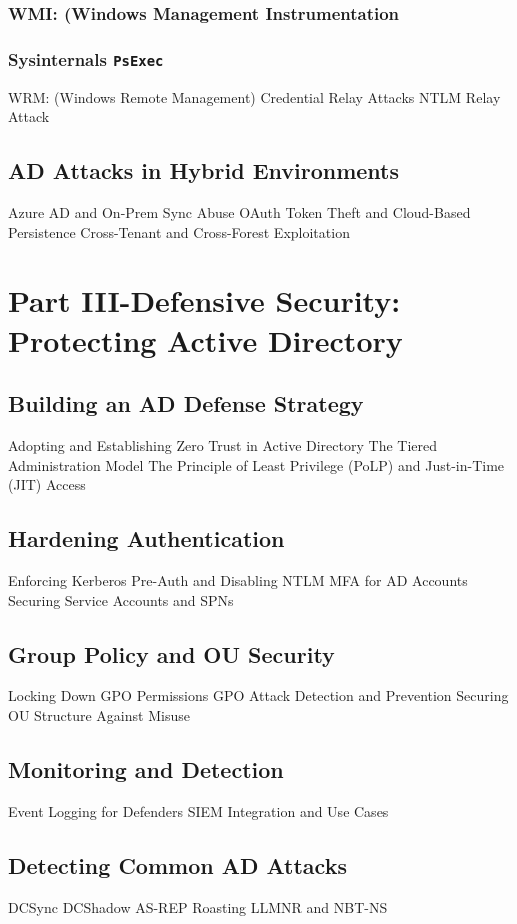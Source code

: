 \documentclass{article}
\begin{document}
\subsubsection{WMI: (Windows Management Instrumentation}
\subsubsection{Sysinternals \texttt{PsExec}}
WRM: (Windows Remote Management)
Credential Relay Attacks
NTLM Relay Attack

\subsection{AD Attacks in Hybrid Environments}
Azure AD and On-Prem Sync Abuse
OAuth Token Theft and Cloud-Based Persistence
Cross-Tenant and Cross-Forest Exploitation

\section{Part III-Defensive Security: Protecting Active Directory}
\subsection{Building an AD Defense Strategy}

Adopting and Establishing Zero Trust in Active Directory
The Tiered Administration Model
The Principle of Least Privilege (PoLP) and Just-in-Time (JIT) Access

\subsection{Hardening Authentication}
Enforcing Kerberos Pre-Auth and Disabling NTLM
MFA for AD Accounts
Securing Service Accounts and SPNs

\subsection{Group Policy and OU Security}
Locking Down GPO Permissions
GPO Attack Detection and Prevention
Securing OU Structure Against Misuse

\subsection{Monitoring and Detection}
Event Logging for Defenders
SIEM Integration and Use Cases

\subsection{Detecting Common AD Attacks}
DCSync
DCShadow
AS-REP Roasting
LLMNR and NBT-NS
\end{document}
